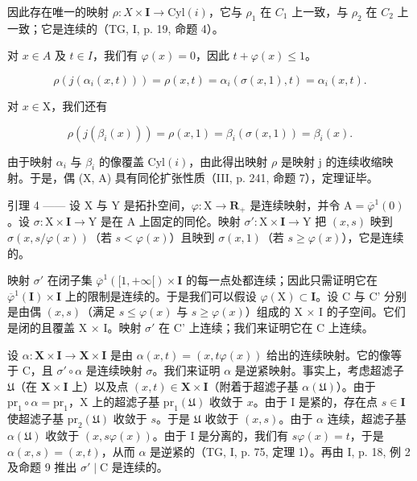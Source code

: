 因此存在唯一的映射 \(\rho\colon X\times\mathbf{I}\to\mathrm{Cyl}(i)\)，它与 \(\rho_{1}\) 在 \(C_{1}\) 上一致，与 \(\rho_{2}\) 在 \(C_{2}\) 上一致；它是连续的（TG, I, p. 19, 命题 4）。

对 \(x \in A\) 及 \(t \in I\)，我们有 \(\varphi(x) = 0\)，因此 \(t + \varphi(x) \leqslant 1\)。

\[
\rho (j (\alpha_ {i} (x, t))) = \rho (x, t) = \alpha_ {i} (\sigma (x, 1), t) = \alpha_ {i} (x, t).
\]

对 \(x\in \mathrm{X}\)，我们还有

\[
\rho (j (\beta_ {i} (x))) = \rho (x, 1) = \beta_ {i} (\sigma (x, 1)) = \beta_ {i} (x).
\]

由于映射 \(\alpha_{i}\) 与 \(\beta_{i}\) 的像覆盖 \(\mathrm{Cyl}(i)\)，由此得出映射 \(\rho\) 是映射 j 的连续收缩映射。于是，偶 (X, A) 具有同伦扩张性质（III, p. 241, 命题 7），定理证毕。

引理 4 —— 设 X 与 Y 是拓扑空间，\(\varphi\colon\mathrm{X}\to\mathbf{R}_{+}\) 是连续映射，并令 \(\mathrm{A}=\overline{\varphi}^{1}(0)\)。设 \(\sigma\colon\mathrm{X}\times\mathbf{I}\to\mathrm{Y}\) 是在 A 上固定的同伦。映射 \(\sigma'\colon\mathrm{X}\times\mathbf{I}\to\mathrm{Y}\) 把 \((x,s)\) 映到 \(\sigma(x,s/\varphi(x))\)（若 \(s<\varphi(x)\)）且映到 \(\sigma(x,1)\)（若 \(s\geqslant\varphi(x)\)），它是连续的。

映射 \(\sigma'\) 在闭子集 \(\overline{\varphi}^{1}([1, +\infty[)\times\mathbf{I}\) 的每一点处都连续；因此只需证明它在 \(\overline{\varphi}^{1}(\mathbf{I})\times\mathbf{I}\) 上的限制是连续的。于是我们可以假设 \(\varphi(\mathrm{X})\subset\mathbf{I}\)。设 C 与 C' 分别是由偶 \((x,s)\)（满足 \(s\leqslant\varphi(x)\) 与 \(s\geqslant\varphi(x)\)）组成的 X × I 的子空间。它们是闭的且覆盖 X × I。映射 \(\sigma'\) 在 C' 上连续；我们来证明它在 C 上连续。

设 \(\alpha\colon\mathbf{X}\times\mathbf{I}\to\mathbf{X}\times\mathbf{I}\) 是由 \(\alpha(x,t)=(x,t\varphi(x))\) 给出的连续映射。它的像等于 C，且 \(\sigma'\circ\alpha\) 是连续映射 \(\sigma\)。我们来证明 \(\alpha\) 是逆紧映射。事实上，考虑超滤子 \(\mathfrak{U}\)（在 \(\mathbf{X}\times\mathbf{I}\) 上）以及点 \((x,t)\in\mathbf{X}\times\mathbf{I}\)（附着于超滤子基 \(\alpha(\mathfrak{U})\)）。由于 \(\mathrm{pr}_{1}\circ\alpha=\mathrm{pr}_{1}\)，X 上的超滤子基 \(\mathrm{pr}_{1}(\mathfrak{U})\) 收敛于 \(x\)。由于 I 是紧的，存在点 \(s\in\mathbf{I}\) 使超滤子基 \(\mathrm{pr}_{2}(\mathfrak{U})\) 收敛于 \(s\)。于是 \(\mathfrak{U}\) 收敛于 \((x,s)\)。由于 \(\alpha\) 连续，超滤子基 \(\alpha(\mathfrak{U})\) 收敛于 \((x,s\varphi(x))\)。由于 I 是分离的，我们有 \(s\varphi(x)=t\)，于是 \(\alpha(x,s)=(x,t)\)，从而 \(\alpha\) 是逆紧的（TG, I, p. 75, 定理 1）。再由 I, p. 18, 例 2 及命题 9 推出 \(\sigma'\mid\mathrm{C}\) 是连续的。

